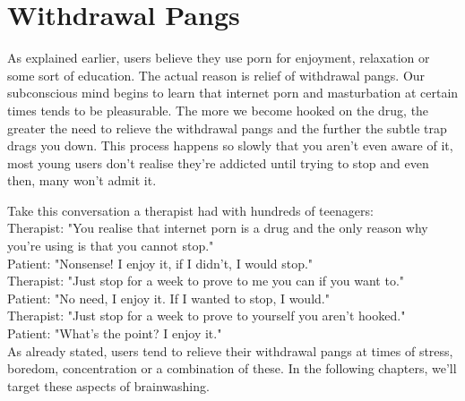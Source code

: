 \documentclass[easypeasy.tex]{subfiles}
\begin{document}
\section{Withdrawal Pangs}

As explained earlier, users believe they use porn for enjoyment, relaxation or some sort of education. The actual reason is relief of withdrawal pangs. Our subconscious mind begins to learn that internet porn and masturbation at certain times tends to be pleasurable. The more we become hooked on the drug, the greater the need to relieve the withdrawal pangs and the further the subtle trap drags you down. This process happens so slowly that you aren't even aware of it, most young users don't realise they're addicted until trying to stop and even then, many won't admit it.

Take this conversation a therapist had with hundreds of teenagers: \\
  Therapist: "You realise that internet porn is a drug and the only reason why you're using is that you cannot stop." \\
  Patient: "Nonsense! I enjoy it, if I didn't, I would stop." \\
  Therapist: "Just stop for a week to prove to me you can if you want to." \\
  Patient: "No need, I enjoy it. If I wanted to stop, I would." \\
  Therapist: "Just stop for a week to prove to yourself you aren't hooked." \\
  Patient: "What's the point? I enjoy it." \\

As already stated, users tend to relieve their withdrawal pangs at times of stress, boredom, concentration or a combination of these. In the following chapters, we'll target these aspects of brainwashing.
\end{document}
